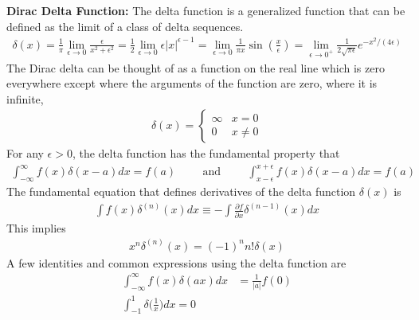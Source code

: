 \textbf{Dirac Delta Function:} The delta function is a generalized function that can be defined as the limit of a class of delta sequences.
\begin{align}
	\delta(x) = \frac{1}{\pi}\lim_{\epsilon\rightarrow 0}\frac{\epsilon}{x^2+\epsilon^2} = \frac{1}{2}\lim_{\epsilon\rightarrow 0}\epsilon|x|^{\epsilon-1} =\lim_{\epsilon\rightarrow 0} \frac{1}{\pi x}\sin\left(\frac{x}{\epsilon}\right) = \lim_{\epsilon\rightarrow 0^+}\frac{1}{2\sqrt{\pi \epsilon}}e^{-x^2/(4\epsilon)}
\end{align}
The Dirac delta can be thought of as a function on the real line which is zero everywhere except where the arguments of the function are zero, where it is infinite,
\begin{align}
	\delta(x) = 
	\begin{cases} 
		\infty & x=0 \\
			 0 & x \neq 0 
	\end{cases}
\end{align}
For any $\epsilon > 0$, the delta function has the fundamental property that 
\begin{align}
	\int_{-\infty}^{\infty}f(x)\delta(x-a)dx = f(a) \hspace{1cm}\textrm{and}\hspace{1cm}\int_{x-\epsilon}^{x+\epsilon}f(x)\delta(x-a)dx = f(a)
\end{align}
The fundamental equation that defines derivatives of the delta function $\delta(x)$ is
\begin{align}
	\int f(x)\delta^{(n)}(x)dx \equiv -\int \frac{\partial f}{\partial x}\delta^{(n-1)}(x)dx
\end{align} 
This implies 
\begin{align}
	x^n\delta^{(n)}(x)=(-1)^nn!\delta(x)
\end{align}
A few identities and common expressions using the delta function are
\begin{align}
	\int_{-\infty}^{\infty}f(x)\delta(ax)dx &= \frac{1}{|a|}f(0) \\
	\int_{-1}^{1}\delta\bigg(\frac{1}{x}\bigg)dx = 0
\end{align}









\newpage



